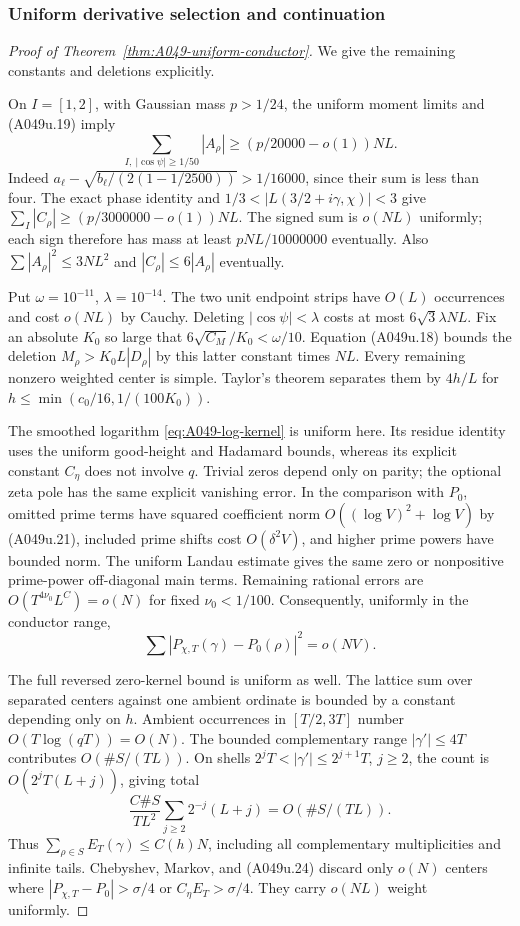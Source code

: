 \subsubsection*{Uniform derivative selection and continuation}

\begin{proof}[Proof of Theorem~\ref{thm:A049-uniform-conductor}]
We give the remaining constants and deletions explicitly.

On $I=[1,2]$, with Gaussian mass $p>1/24$, the uniform
moment limits and (A049u.19) imply
\[
 \sum_{I,\ |\cos\psi|\ge1/50}|A_\rho|
             \ge(p/20000-o(1))NL .
\]
Indeed $a_\ell-\sqrt{b_\ell/(2(1-1/2500))}>1/16000$,
since their sum is less than four.
The exact phase identity and
$1/3<|L(3/2+i\gamma,\chi)|<3$ give
$\sum_I|C_\rho|\ge(p/3000000-o(1))NL$.
The signed sum is $o(NL)$ uniformly; each sign therefore
has mass at least $pNL/10000000$ eventually.
Also $\sum|A_\rho|^2\le3NL^2$ and
$|C_\rho|\le6|A_\rho|$ eventually.

Put $\omega=10^{-11}$, $\lambda=10^{-14}$.
The two unit endpoint strips have $O(L)$ occurrences
and cost $o(NL)$ by Cauchy. Deleting
$|\cos\psi|<\lambda$ costs at most $6\sqrt3\lambda NL$.
Fix an absolute $K_0$ so large that
$6\sqrt{C_M}/K_0<\omega/10$.
Equation (A049u.18) bounds the deletion
$M_\rho>K_0L|D_\rho|$ by this latter constant times
$NL$. Every remaining nonzero weighted center is
simple. Taylor's theorem separates them by $4h/L$
for $h\le\min(c_0/16,1/(100K_0))$.

The smoothed logarithm \eqref{eq:A049-log-kernel}
is uniform here. Its residue identity uses the
uniform good-height and Hadamard bounds, whereas
its explicit constant $C_\eta$ does not involve $q$.
Trivial zeros depend only on parity; the optional
zeta pole has the same explicit vanishing error.
In the comparison with $P_0$, omitted prime terms
have squared coefficient norm
$O((\log V)^2+\log V)$ by (A049u.21), included prime
shifts cost $O(\delta^2V)$, and higher prime powers
have bounded norm. The uniform Landau estimate gives
the same zero or nonpositive prime-power off-diagonal
main terms. Remaining rational errors are
$O(T^{4\nu_0}L^C)=o(N)$ for fixed $\nu_0<1/100$.
Consequently, uniformly in the conductor range,
\[
          \sum|P_{\chi,T}(\gamma)-P_0(\rho)|^2=o(NV).
\tag{A049u.24}
\]

The full reversed zero-kernel bound is uniform as well.
The lattice sum over separated centers against one
ambient ordinate is bounded by a constant depending
only on $h$. Ambient occurrences in $[T/2,3T]$
number $O(T\log(qT))=O(N)$.
The bounded complementary range $|\gamma'|\le4T$
contributes $O(\#S/(TL))$.
On shells $2^jT<|\gamma'|\le2^{j+1}T$, $j\ge2$,
the count is $O(2^jT(L+j))$, giving total
\[
 \frac{C\#S}{TL^2}\sum_{j\ge2}2^{-j}(L+j)
                         =O(\#S/(TL)).
\]
Thus $\sum_{\rho\in S}E_T(\gamma)\le C(h)N$, including
all complementary multiplicities and infinite tails.
Chebyshev, Markov, and (A049u.24) discard only $o(N)$
centers where $|P_{\chi,T}-P_0|>\sigma/4$ or
$C_\eta E_T>\sigma/4$. They carry $o(NL)$ weight uniformly.


\end{proof}
